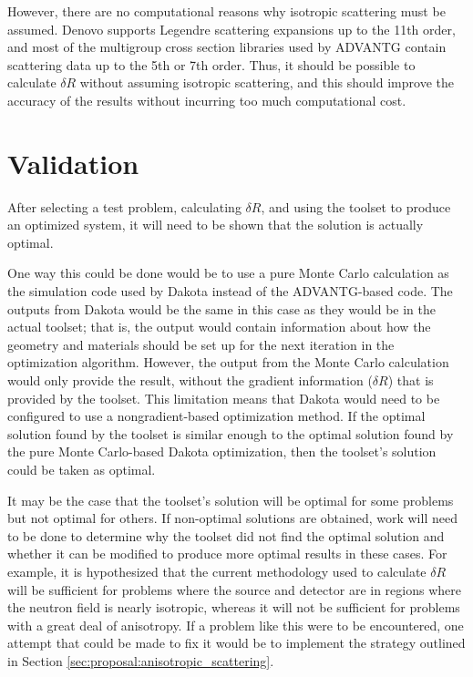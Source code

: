 However, there are no computational reasons why isotropic scattering must be assumed.
Denovo supports Legendre scattering expansions up to the 11th order, and most of the multigroup cross section libraries used by ADVANTG contain scattering data up to the 5th or 7th order.
Thus, it should be possible to calculate $\delta R$ without assuming isotropic scattering, and this should improve the accuracy of the results without incurring too much computational cost.


\section{Validation}
\label{sec:proposal:validation}

After selecting a test problem, calculating $\delta R$, and using the toolset to produce an optimized system, it will need to be shown that the solution is actually optimal.

One way this could be done would be to use a pure Monte Carlo calculation as the simulation code used by Dakota instead of the ADVANTG-based code.
The outputs from Dakota would be the same in this case as they would be in the actual toolset; that is, the output would contain information about how the geometry and materials should be set up for the next iteration in the optimization algorithm.
However, the output from the Monte Carlo calculation would only provide the result, without the gradient information ($\delta R$) that is provided by the toolset.
This limitation means that Dakota would need to be configured to use a nongradient-based optimization method.
If the optimal solution found by the toolset is similar enough to the optimal solution found by the pure Monte Carlo-based Dakota optimization, then the toolset's solution could be taken as optimal.

It may be the case that the toolset's solution will be optimal for some problems but not optimal for others.
If non-optimal solutions are obtained, work will need to be done to determine why the toolset did not find the optimal solution and whether it can be modified to produce more optimal results in these cases.
For example, it is hypothesized that the current methodology used to calculate $\delta R$ will be sufficient for problems where the source and detector are in regions where the neutron field is nearly isotropic, whereas it will not be sufficient for problems with a great deal of anisotropy.
If a problem like this were to be encountered, one attempt that could be made to fix it would be to implement the strategy outlined in Section \ref{sec:proposal:anisotropic_scattering}.

